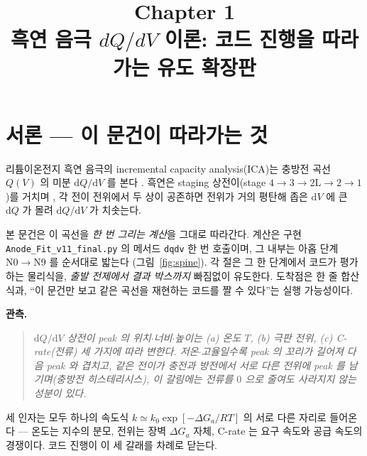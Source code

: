 \documentclass[11pt,a4paper]{article}
\title{\textbf{\LARGE Chapter 1}\\[0.35em]\Large 흑연 음극 $dQ/dV$ 이론: 코드 진행을 따라가는 유도 확장판}
\author{}
\date{}
\newcommand{\dd}{\mathrm{d}}
\newcommand{\code}[1]{\texttt{#1}}
\begin{document}
\maketitle

\section*{서론 — 이 문건이 따라가는 것}
리튬이온전지 흑연 음극의 incremental capacity analysis(ICA)는 충방전 곡선 $Q(V)$ 의 미분
$\dd Q/\dd V$ 를 본다 \cite{bloom2005,dubarry2012}. 흑연은 staging 상전이(stage
$4\!\to\!3\!\to\!2\mathrm L\!\to\!2\!\to\!1$)를 거치며 \cite{dahn1991,ohzuku1993}, 각 전이 전위에서
두 상이 공존하면 전위가 거의 평탄해 좁은 $\dd V$ 에 큰 $\dd Q$ 가 몰려 $\dd Q/\dd V$ 가 치솟는다.

본 문건은 이 곡선을 \emph{한 번 그리는 계산}을 그대로 따라간다. 계산은 구현 \code{Anode\_Fit\_v11\_final.py}
의 메서드 \code{dqdv} 한 번 호출이며, 그 내부는 아홉 단계 $\mathrm N0\!\to\!\mathrm N9$ 를 순서대로 밟는다
(그림~\ref{fig:spine}). 각 절은 그 한 단계에서 코드가 평가하는 물리식을, \emph{출발 전제에서 결과 박스까지} 빠짐없이
유도한다. 도착점은 한 줄 합산식과, ``이 문건만 보고 같은 곡선을 재현하는 코드를 짤 수 있다''는 실행 가능성이다.

\textbf{관측.}
\begin{quote}\itshape
$\dd Q/\dd V$ 상전이 peak 의 위치$\cdot$너비$\cdot$높이는 (a) 온도 $T$, (b) 극판 전위, (c) C-rate(전류)
세 가지에 따라 변한다. 저온$\cdot$고율일수록 peak 의 꼬리가 길어져 다음 peak 와 겹치고, 같은 전이가 충전과 방전에서
서로 다른 전위에 peak 를 남기며(충방전 히스테리시스), 이 갈림에는 전류를 $0$ 으로 줄여도 사라지지 않는 성분이 있다.
\end{quote}

세 인자는 모두 하나의 속도식 $k\simeq k_0\exp[-\Delta G_a/RT]$ 의 서로 다른 자리로 들어온다 — 온도는 지수의 분모,
전위는 장벽 $\Delta G_a$ 자체, C-rate 는 요구 속도와 공급 속도의 경쟁이다. 코드 진행이 이 세 갈래를 차례로 닫는다.
\end{document}
